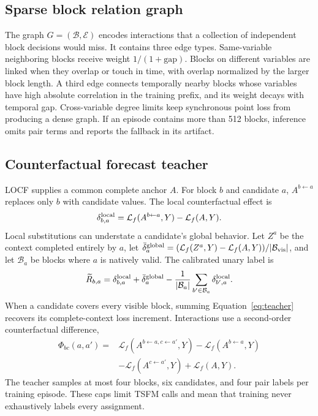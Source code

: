\documentclass{article}
\begin{document}
\subsection{Sparse block relation graph}

The graph $G=(\mathcal B,\mathcal E)$ encodes interactions that a collection of independent block decisions would miss. It contains three edge types. Same-variable neighboring blocks receive weight $1/(1+\mathrm{gap})$. Blocks on different variables are linked when they overlap or touch in time, with overlap normalized by the larger block length. A third edge connects temporally nearby blocks whose variables have high absolute correlation in the training prefix, and its weight decays with temporal gap. Cross-variable degree limits keep synchronous point loss from producing a dense graph. If an episode contains more than 512 blocks, inference omits pair terms and reports the fallback in its artifact.

\subsection{Counterfactual forecast teacher}

LOCF supplies a common complete anchor $A$. For block $b$ and candidate $a$, $A^{b\leftarrow a}$ replaces only $b$ with candidate values. The local counterfactual effect is
\begin{equation}
\delta^{\rm local}_{b,a}=\mathcal L_f(A^{b\leftarrow a},Y)-\mathcal L_f(A,Y).
\end{equation}
Local substitutions can understate a candidate's global behavior. Let $Z^a$ be the context completed entirely by $a$, let $\bar\delta^{\rm global}_a=(\mathcal L_f(Z^a,Y)-\mathcal L_f(A,Y))/|\mathcal B_{\rm vis}|$, and let $\mathcal B_a$ be blocks where $a$ is natively valid. The calibrated unary label is
\begin{equation}
\widetilde R_{b,a}=\delta^{\rm local}_{b,a}+\bar\delta^{\rm global}_a
-\frac{1}{|\mathcal B_a|}\sum_{b'\in\mathcal B_a}\delta^{\rm local}_{b',a}.
\label{eq:teacher}
\end{equation}
When a candidate covers every visible block, summing Equation~\ref{eq:teacher} recovers its complete-context loss increment. Interactions use a second-order counterfactual difference,
\begin{align}
\Phi_{bc}(a,a')={}&\mathcal L_f(A^{b\leftarrow a,c\leftarrow a'},Y)
-\mathcal L_f(A^{b\leftarrow a},Y)\nonumber\\
&-\mathcal L_f(A^{c\leftarrow a'},Y)+\mathcal L_f(A,Y).
\end{align}
The teacher samples at most four blocks, six candidates, and four pair labels per training episode. These caps limit TSFM calls and mean that training never exhaustively labels every assignment.
\end{document}
